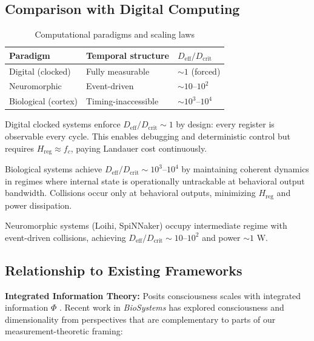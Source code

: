 \documentclass[12pt]{article}
\begin{document}
\subsection{Comparison with Digital Computing}

\begin{table}[h]
\centering
\small
\caption{Computational paradigms and scaling laws}
\begin{tabular}{lp{4cm}p{3cm}}
\toprule
Paradigm & Temporal structure & $D_{\text{eff}}/D_{\text{crit}}$ \\
\midrule
Digital (clocked) & Fully measurable & $\sim 1$ (forced) \\
Neuromorphic & Event-driven & $\sim 10$--$10^2$ \\
Biological (cortex) & Timing-inaccessible & $\sim 10^3$--$10^4$ \\
\bottomrule
\end{tabular}
\end{table}

Digital clocked systems enforce $D_{\text{eff}}/D_{\text{crit}} \sim 1$ by design: every register is observable every cycle. This enables debugging and deterministic control but requires $H_{\text{reg}} \approx f_c$, paying Landauer cost continuously.

Biological systems achieve $D_{\text{eff}}/D_{\text{crit}} \sim 10^3$--$10^4$ by maintaining coherent dynamics in regimes where internal state is operationally untrackable at behavioral output bandwidth. Collisions occur only at behavioral outputs, minimizing $H_{\text{reg}}$ and power dissipation.

Neuromorphic systems (Loihi, SpiNNaker) occupy intermediate regime with event-driven collisions, achieving $D_{\text{eff}}/D_{\text{crit}} \sim 10$--$10^2$ and power $\sim 1$ W.

\subsection{Relationship to Existing Frameworks}

\textbf{Integrated Information Theory:} Posits consciousness scales with integrated information $\Phi$ \cite{tononi2004}. Recent work in \textit{BioSystems} has explored consciousness and dimensionality from perspectives that are complementary to parts of our measurement-theoretic framing:
\end{document}
